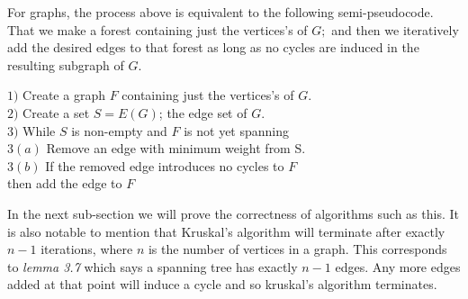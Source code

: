 \documentclass[../main.tex]{subfiles}
\begin{document}
For graphs, the process above is equivalent to the following semi-pseudocode. That we make a forest containing just the vertices's of $G;$ and then we iteratively add the desired edges to that forest as long as no cycles are induced in the resulting subgraph of $G.$
\begin{algorithm}
$1)$ Create a graph $F$ containing just the vertices's of $G.$\\
$2)$ Create a set $S = E(G)$; the edge set of $G.$ \\
$3)$ While $S$ is non-empty and $F$ is not yet spanning\\
\hspace{5mm} $3(a)$ Remove an edge with minimum weight from S.\\
\hspace{5mm} $3(b)$ If the removed edge introduces no cycles to $F$\\
\hspace{5mm} then add the edge to $F$\\
\end{algorithm}

In the next sub-section we will prove the correctness of algorithms such as this. It is also notable to mention that Kruskal's algorithm will terminate after exactly $n-1$ iterations, where $n$ is the number of vertices in a graph. This corresponds to \textit{lemma 3.7} which says a spanning tree has exactly $n-1$ edges. Any more edges added at that point will induce a cycle and so kruskal's algorithm terminates.
\end{document}
